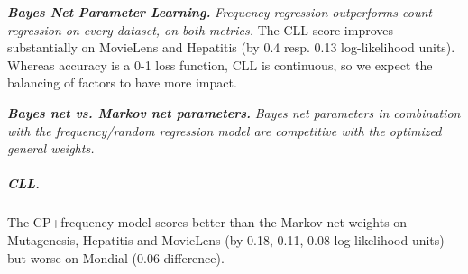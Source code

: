 \documentclass{article}
\begin{document}
\textbf{\em Bayes Net Parameter Learning.} {\em Frequency regression outperforms count regression on every dataset, on both metrics.} The CLL score improves substantially on MovieLens and Hepatitis (by 0.4 resp. 0.13 log-likelihood units). Whereas accuracy is a 0-1 loss function, CLL is continuous, so we expect the balancing of factors to have more impact. 
%
%

\textbf{\em Bayes net vs. Markov net parameters.} 
{\em Bayes net parameters in combination with the frequency/random regression model are competitive with the optimized general weights.} 
 
\subparagraph{CLL.}
The CP+frequency  model scores better than the Markov net weights on Mutagenesis, Hepatitis and MovieLens (by 0.18, 0.11, 0.08 log-likelihood units) but worse on Mondial (0.06 difference). 

\end{document}
